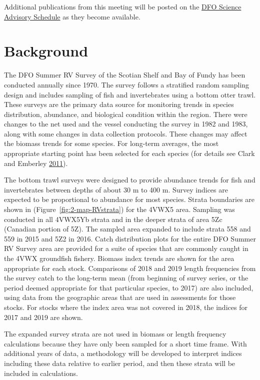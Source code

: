 \documentclass[11pt]{book}
\begin{document}
Additional publications from this meeting will be posted on the \href{http://www.isdm-gdsi.gc.ca/csas-sccs/applications/events-evenements/index-eng.asp}{DFO Science Advisory Schedule} as they become available.

\hypertarget{background}{%
\section{Background}\label{background}}

The DFO Summer RV Survey of the Scotian Shelf and Bay of Fundy has been conducted annually since 1970. The survey follows a stratified random sampling design and includes sampling of fish and invertebrates using a bottom otter trawl. These surveys are the primary data source for monitoring trends in species distribution, abundance, and biological condition within the region. There were changes to the net used and the vessel conducting the survey in 1982 and 1983, along with some changes in data collection protocols. These changes may affect the biomass trends for some species. For long-term averages, the most appropriate starting point has been selected for each species (for details see Clark and Emberley \protect\hyperlink{ref-ClarkEmberley2011}{2011}).

The bottom trawl surveys were designed to provide abundance trends for fish and invertebrates between depths of about 30 m to 400 m. Survey indices are expected to be proportional to abundance for most species. Strata boundaries are shown in (Figure~\ref{fig:2-map-RVstrata}) for the 4VWX5 area. Sampling was conducted in all 4VWX5Yb strata and in the deeper strata of area 5Zc (Canadian portion of 5Z). The sampled area expanded to include strata 558 and 559 in 2015 and 5Z2 in 2016. Catch distribution plots for the entire DFO Summer RV Survey area are provided for a suite of species that are commonly caught in the 4VWX groundfish fishery. Biomass index trends are shown for the area appropriate for each stock. Comparisons of 2018 and 2019 length frequencies from the survey catch to the long-term mean (from beginning of survey series, or the period deemed appropriate for that particular species, to 2017) are also included, using data from the geographic areas that are used in assessments for those stocks. For stocks where the index area was not covered in 2018, the indices for 2017 and 2019 are shown.

The expanded survey strata are not used in biomass or length frequency calculations because they have only been sampled for a short time frame. With additional years of data, a methodology will be developed to interpret indices including these data relative to earlier period, and then these strata will be included in calculations.
\end{document}
